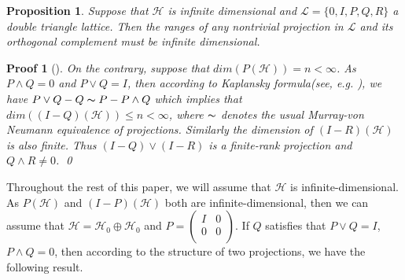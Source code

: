 \documentclass{jaums}
\theoremstyle{thmit} %
\newtheorem{proposition}[theorem]{Proposition}
\theoremstyle{thmrm} %
\newtheorem*{oldproof}{Proof}
\renewenvironment{proof}[1][{}]{\begin{oldproof}[#1]}{\qed\end{oldproof}}
\begin{document}
\begin{proposition}
Suppose that $\mathcal{H}$ is infinite dimensional and
$\mathcal{L}=\{0,I,P,Q,R\}$ a double triangle lattice.
Then the ranges of any nontrivial projection in $\mathcal{L}$ and its orthogonal
complement must be infinite dimensional.
\end{proposition}
\begin{proof} On the contrary, suppose that $dim(P(\mathcal{H}))=n<\infty$. As
$P\wedge Q=0$ and $P\vee Q=I$,
then according to Kaplansky formula(see, e.g. \cite{[KR]}), we have $P\vee
Q-Q\thicksim P-P\wedge Q$
which implies
that $dim((I-Q)(\mathcal{H}))\leqslant n<\infty$, where $\thicksim$ denotes the
usual Murray-von Neumann equivalence of projections. Similarly the dimension of
$(I-R)(\mathcal{H})$ is also finite.
Thus $(I-Q)\vee (I-R)$ is a finite-rank projection and $Q\wedge R\neq0$.
\end{proof}

Throughout the rest of this paper, we will assume that $\mathcal{H}$ is
infinite-dimensional.
As $P(\mathcal{H})$ and $(I-P)(\mathcal{H})$ both are infinite-dimensional, then
we can assume that $\mathcal{H}=\mathcal{H}_0\oplus\mathcal{H}_0$ and
$P=\left(
                                        \begin{array}{cc}
                                          I & 0 \\
                                          0 & 0 \\
                                        \end{array}
                                      \right)$. If $Q$ satisfies that $P\vee
Q=I$, $P\wedge Q=0$, then according to
                                      the structure of two projections, we have
the following result.
\end{document}
